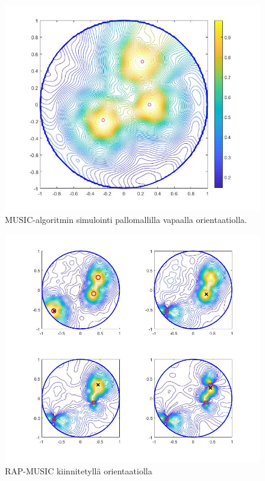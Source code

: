 \begin{figure}[h]
    \centering
    \includegraphics[scale=0.41]{mfree.jpg}
    \caption{MUSIC-algoritmin simulointi pallomallilla vapaalla orientaatiolla.}
    \label{fig:mfree}
\end{figure}

\clearpage

\begin{figure}[ht]
    \centering
    \includegraphics[width=\textwidth]{RAPfixed.jpg}
    \caption{RAP-MUSIC kiinnitetyllä orientaatiolla}
    \label{fig:RAPfix}
\end{figure}


